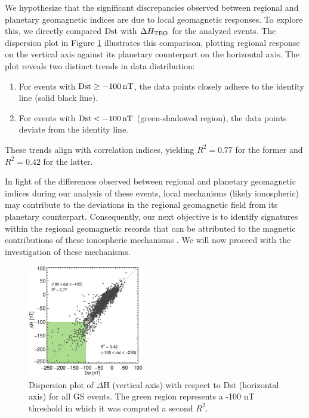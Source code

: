 \documentclass[a4paper,fleqn]{cas-dc}
\begin{document}
We hypothesize that the significant discrepancies observed between regional and planetary geomagnetic indices are due to local geomagnetic responses. To explore this, we directly compared ${\rm Dst}$ with $\Delta H_{\rm TEO}$ for the analyzed events. The dispersion plot in Figure \ref{fig:disp} illustrates this comparison, plotting regional response on the vertical axis against its planetary counterpart on the horizontal axis. The plot reveals two distinct trends in data distribution: 

\begin{enumerate}
    \item For events with ${\rm Dst} \ge {\rm -100\, nT}$, the data points closely adhere to the identity line (solid black line).
    \item For events with ${\rm Dst} < {\rm -100\, nT}$ (green-shadowed region), the data points deviate from the identity line.
\end{enumerate}

These trends align with correlation indices, yielding $R^2=0.77$ for the former and $R^2=0.42$ for the latter.

In light of the differences observed between regional and planetary geomagnetic indices during our analysis of these events, local mechanisms (likely ionospheric) may contribute to the deviations in the regional geomagnetic field from its planetary counterpart. Consequently, our next objective is to identify signatures within the regional geomagnetic records that can be attributed to the magnetic contributions of these ionospheric mechanisms \citep{ddyn2005, angeoddyn, amorymazaudier_2017, amory2020_filtros}. We will now proceed with the investigation of these mechanisms.

\begin{figure}
    \centering
     \includegraphics[width=0.45\textwidth]{images/disp_dst_v_dh/dispersion_general_dst.eps}
      \caption{Dispersion plot of $\Delta$H (vertical axis) with respect to Dst (horizontal axis) for all GS events. The green region represents a -100 nT threshold in which it was computed a second $R^2$.}
       \label{fig:disp}
\end{figure}
\end{document}

